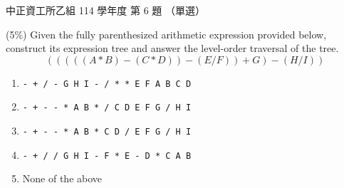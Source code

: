 \begin{pastexam}[label={px:ccu-114-csb-06}]{中正資工所乙組 114 學年度 第 6 題}
（單選）

(5\%) Given the fully parenthesized arithmetic expression provided below, construct its expression tree and answer the level-order traversal of the tree.
\[ (((((A * B) - (C * D)) - (E / F)) + G) - (H / I)) \]
\begin{enumerate}[label=\Alph*.]
\item \texttt{- + / - G H I - / * * E F A B C D}
\item \texttt{- + - - * A B * / C D E F G / H I}
\item \texttt{- + - - * A B * C D / E F G / H I}
\item \texttt{- + / / G H I - F * E - D * C A B}
\item None of the above
\end{enumerate}
\end{pastexam}

